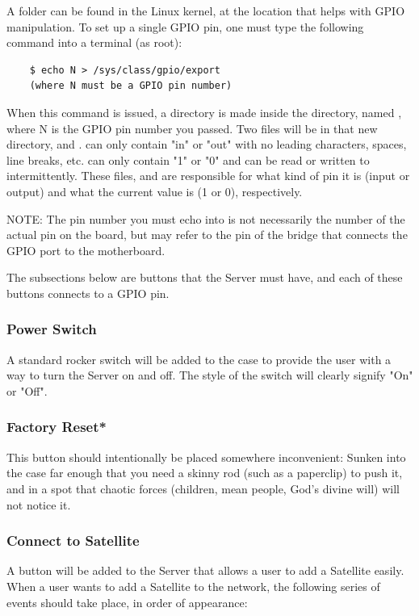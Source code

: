 A folder can be found in the Linux kernel, at the location  that helps with GPIO manipulation. 
To set up a single GPIO pin, one must type the following command into a terminal (as root):

\begin{lstlisting}
	$ echo N > /sys/class/gpio/export
	(where N must be a GPIO pin number)
\end{lstlisting}

When this command is issued, a directory is made inside the  directory, named , where N is the GPIO pin number you passed. 
Two files will be in that new directory,  and . 
 can only contain "in" or "out" with no leading characters, spaces, line breaks, etc.
 can only contain "1" or "0" and can be read or written to intermittently.
These files,  and  are responsible for what kind of pin it is (input or output) and what the current value is (1 or 0), respectively.

NOTE: The pin number you must echo into  is not necessarily the number of the actual pin on the board, 
but may refer to the pin of the bridge that connects the GPIO port to the motherboard.

The subsections below are buttons that the Server must have, and each of these buttons connects to a GPIO pin.


\subsubsection{Power Switch}
A standard rocker switch will be added to the case to provide the user with a way to turn the Server on and off. 
The style of the switch will clearly signify "On" or "Off".

\subsubsection{Factory Reset*}
This button should intentionally be placed somewhere inconvenient: 
Sunken into the case far enough that you need a skinny rod (such as a paperclip) to push it, and in a spot
that chaotic forces (children, mean people, God's divine will) will not notice it.

\subsubsection{Connect to Satellite}
A button will be added to the Server that allows a user to add a Satellite easily.
When a user wants to add a Satellite to the network, the following series of events should take place, in order of appearance:


